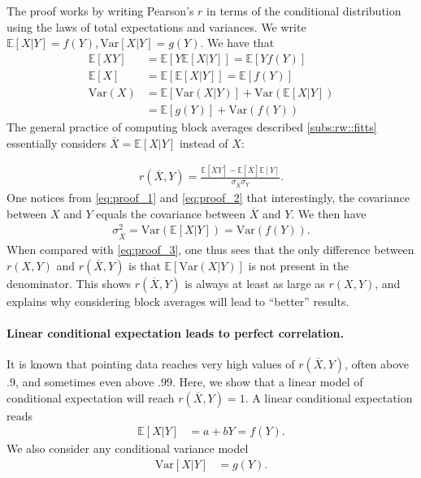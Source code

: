 \documentclass[acmlarge, manuscript,review]{acmart}
\begin{document}
The proof works by writing Pearson's $r$ in terms of the conditional distribution using the laws of total expectations and variances.
We write $\mathbb{E}[X|Y] = f(Y), \text{Var}[X|Y] = g(Y)$. We have that
\begin{align}
  \mathbb{E}[XY] & = \mathbb{E}[Y\mathbb{E}[X|Y]]   =      \mathbb{E}[Yf(Y)]   \label{eq:proof_1}                   \\
  \mathbb{E}[X]  & = \mathbb{E}[\mathbb{E}[X|Y]] = \mathbb{E}[f(Y)]           \label{eq:proof_2}                    \\
  \text{Var}(X)  & = \mathbb{E}[\text{Var}(X|Y)] + \text{Var}(\mathbb{E}[X|Y])                   \label{eq:proof_3} \\
  & = \mathbb{E}[g(Y)] + \text{Var}(f(Y))
\end{align}
The general practice of computing block averages described \autoref{subs:rw::fitts} essentially considers $\overline{X} = \mathbb{E}[X|Y]$ instead of $X$:

\begin{align}
  r(\overline{X},Y) = \frac{\mathbb{E}[\overline{X}Y] - \mathbb{E}[\overline{X}]\mathbb{E}[Y]}{\sigma_{\overline{X}} \sigma_Y}.
\end{align}
One notices from \autoref{eq:proof_1} and \autoref{eq:proof_2} that interestingly, the covariance between $X$ and $Y$ equals the covariance between $\overline{X}$ and $Y$. We then have
\begin{align}
  \sigma_{\overline{X}}^2 = \text{Var}(\mathbb{E}[X|Y]) = \text{Var}(f(Y)).
\end{align}
When compared with \autoref{eq:proof_3}, one thus sees that the only difference between $r(X,Y)$ and $r(\overline{X},Y)$ is that $\mathbb{E}[\text{Var}(X|Y)]$ is not present in the denominator. This shows $r(\overline{X},Y)$ is always at least as large as $r(X,Y)$, and explains why considering block averages will lead to ``better'' results.

\paragraph{Linear conditional expectation leads to perfect correlation.}
It is known that pointing data reaches very high values of $r(\overline{X},Y)$, often above $.9$, and sometimes even above $.99$. Here, we show that a linear model of conditional expectation will reach $r(\overline{X},Y) = 1$.
A linear conditional expectation reads
\begin{align}
  \mathbb{E}[X|Y] & = a + b Y  = f(Y).
\end{align}
We also consider any conditional variance model
\begin{align}
  \text{Var}[X|Y] & = g(Y).
\end{align}
\end{document}
